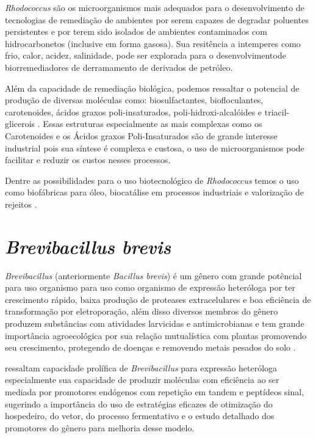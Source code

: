 \textit{Rhodococcus} são os microorganismos mais adequados para o desenvolvimento de
tecnologias de remediação de ambientes por serem capazes de degradar poluentes persistentes e por
terem sido isolados de ambientes contaminados com hidrocarbonetos 
(inclusive em forma gasosa)\cite{kuyukina2019}. Sua resitência a intemperes como frio, calor, acidez,
salinidade, pode ser explorada para o desenvolvimentode biorremediadores de derramamento de derivados
de petróleo.

Além da capacidade de remediação biológica, podemos ressaltar o potencial de produção de diversas moléculas
como: biosulfactantes, biofloculantes, carotenoides, ácidos graxos poli-insaturados, poli-hidroxi-alcalóides e
triacil-glicerois \cite{cappelletti2020}. Essas estruturas especialmente as mais complexas como os
Carotenoides e os Ácidos graxos Poli-Insaturados são de grande interesse industrial pois sua síntese 
é complexa e custosa, o uso de microorganismos pode facilitar e reduzir os custos nesses processos.

Dentre as possibilidades para o uso biotecnológico de \textit{Rhodococcus} temos o uso como biofábricas 
para óleo, biocatálise em processos industriais e valorização de rejeitos \cite{alvarez2021,krivoruchko2019,anthony2019,chatterjee2020}.

\section{\textit{Brevibacillus brevis}}
\textit{Brevibacillus} (anteriormente \textit{Bacillus brevis}) é um gênero com grande potêncial para uso organismo para uso como organismo de expressão heteróloga
por ter crescimento rápido, baixa produção de proteases extracelulares e boa eficiência de transformação
por eletroporação, além disso diversos membros do gênero produzem substâncias com atividades 
larvicidas e antimicrobianas e tem grande importância agroecológica por sua relação mutualística
com plantas promovendo seu crescimento, protegendo de doenças e removendo metais pesados do solo
\cite{panda2014brevibacillus,ray2020brevibacillus}.  

 ressaltam  capacidade prolífica de \textit{Brevibacillus} para expressão heteróloga
especialmente sua capacidade de produzir moléculas com eficiência ao ser mediada por promotores endógenos
com repetição em tandem e peptídeos sinal, sugerindo a importância do uso de estratégias eficazes de otimização do hospedeiro, do vetor,
do processo fermentativo e o estudo detalhado dos promotores do gênero para melhoria desse modelo.

